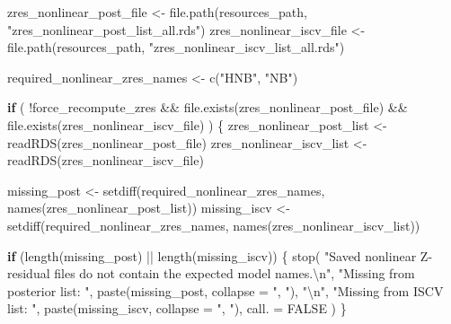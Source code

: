 \documentclass[
  english,
  letterpaper,
  DIV=11,
  numbers=noendperiod]{scrartcl}
\newenvironment{Shaded}{\begin{snugshade}}{\end{snugshade}}
\newcommand{\AttributeTok}[1]{\textcolor[rgb]{0.40,0.45,0.13}{#1}}
\newcommand{\ConstantTok}[1]{\textcolor[rgb]{0.56,0.35,0.01}{#1}}
\newcommand{\ControlFlowTok}[1]{\textcolor[rgb]{0.00,0.23,0.31}{\textbf{#1}}}
\newcommand{\FunctionTok}[1]{\textcolor[rgb]{0.28,0.35,0.67}{#1}}
\newcommand{\NormalTok}[1]{\textcolor[rgb]{0.00,0.23,0.31}{#1}}
\newcommand{\OtherTok}[1]{\textcolor[rgb]{0.00,0.23,0.31}{#1}}
\newcommand{\SpecialCharTok}[1]{\textcolor[rgb]{0.37,0.37,0.37}{#1}}
\newcommand{\StringTok}[1]{\textcolor[rgb]{0.13,0.47,0.30}{#1}}
\begin{document}
\begin{Shaded}
\begin{Highlighting}[]
\NormalTok{zres\_nonlinear\_post\_file }\OtherTok{\textless{}{-}} \FunctionTok{file.path}\NormalTok{(resources\_path, }\StringTok{"zres\_nonlinear\_post\_list\_all.rds"}\NormalTok{)}
\NormalTok{zres\_nonlinear\_iscv\_file }\OtherTok{\textless{}{-}} \FunctionTok{file.path}\NormalTok{(resources\_path, }\StringTok{"zres\_nonlinear\_iscv\_list\_all.rds"}\NormalTok{)}

\NormalTok{required\_nonlinear\_zres\_names }\OtherTok{\textless{}{-}} \FunctionTok{c}\NormalTok{(}\StringTok{"HNB"}\NormalTok{, }\StringTok{"NB"}\NormalTok{)}

\ControlFlowTok{if}\NormalTok{ (}
  \SpecialCharTok{!}\NormalTok{force\_recompute\_zres }\SpecialCharTok{\&\&}
    \FunctionTok{file.exists}\NormalTok{(zres\_nonlinear\_post\_file) }\SpecialCharTok{\&\&}
    \FunctionTok{file.exists}\NormalTok{(zres\_nonlinear\_iscv\_file)}
\NormalTok{) \{}
\NormalTok{  zres\_nonlinear\_post\_list }\OtherTok{\textless{}{-}} \FunctionTok{readRDS}\NormalTok{(zres\_nonlinear\_post\_file)}
\NormalTok{  zres\_nonlinear\_iscv\_list }\OtherTok{\textless{}{-}} \FunctionTok{readRDS}\NormalTok{(zres\_nonlinear\_iscv\_file)}

\NormalTok{  missing\_post }\OtherTok{\textless{}{-}} \FunctionTok{setdiff}\NormalTok{(required\_nonlinear\_zres\_names, }\FunctionTok{names}\NormalTok{(zres\_nonlinear\_post\_list))}
\NormalTok{  missing\_iscv }\OtherTok{\textless{}{-}} \FunctionTok{setdiff}\NormalTok{(required\_nonlinear\_zres\_names, }\FunctionTok{names}\NormalTok{(zres\_nonlinear\_iscv\_list))}

  \ControlFlowTok{if}\NormalTok{ (}\FunctionTok{length}\NormalTok{(missing\_post) }\SpecialCharTok{||} \FunctionTok{length}\NormalTok{(missing\_iscv)) \{}
    \FunctionTok{stop}\NormalTok{(}
      \StringTok{"Saved nonlinear Z{-}residual files do not contain the expected model names.}\SpecialCharTok{\textbackslash{}n}\StringTok{"}\NormalTok{,}
      \StringTok{"Missing from posterior list: "}\NormalTok{, }\FunctionTok{paste}\NormalTok{(missing\_post, }\AttributeTok{collapse =} \StringTok{", "}\NormalTok{), }\StringTok{"}\SpecialCharTok{\textbackslash{}n}\StringTok{"}\NormalTok{,}
      \StringTok{"Missing from ISCV list: "}\NormalTok{, }\FunctionTok{paste}\NormalTok{(missing\_iscv, }\AttributeTok{collapse =} \StringTok{", "}\NormalTok{),}
      \AttributeTok{call. =} \ConstantTok{FALSE}
\NormalTok{    )}
\NormalTok{  \}}


\end{Highlighting}
\end{Shaded}
\end{document}
